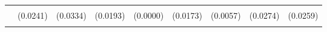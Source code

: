 \begin{table}[!h]
\begin{tabular}[t]{lllllllll}
\addlinespace
\cellcolor{gray!10}{WSLS} & \cellcolor{gray!10}{0.0267} & \cellcolor{gray!10}{0.0932**} & \cellcolor{gray!10}{0.0177} & \cellcolor{gray!10}{0.0000} & \cellcolor{gray!10}{0.0266} & \cellcolor{gray!10}{0.0000} & \cellcolor{gray!10}{0.0471} & \cellcolor{gray!10}{0.0587*}\\
 & (0.0241) & (0.0334) & (0.0193) & (0.0000) & (0.0173) & (0.0057) & (0.0274) & (0.0259)\\
\cellcolor{gray!10}{T2} & \cellcolor{gray!10}{0.1009} & \cellcolor{gray!10}{0.1640*} & \cellcolor{gray!10}{0.0000} & \cellcolor{gray!10}{0.0500} & \cellcolor{gray!10}{0.0775} & \cellcolor{gray!10}{0.0792*} & \cellcolor{gray!10}{0.2017**} & \cellcolor{gray!10}{0.0884}\\
\bottomrule
\end{tabular}
\end{table}